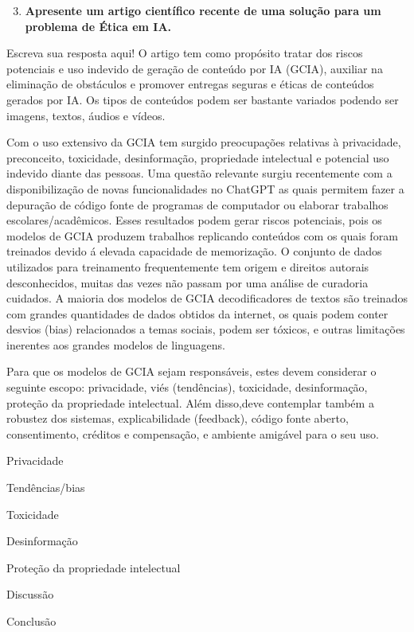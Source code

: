 \begin{enumerate}\setcounter{enumi}{2}\bfseries
    \item  \textbf{Apresente um artigo científico recente de uma solução para um problema de Ética em IA.}
\end{enumerate}

Escreva sua resposta aqui!
O artigo \cite{chen_fu_lyu} tem como propósito tratar dos riscos potenciais e uso indevido de geração de conteúdo 
por IA (GCIA), 
auxiliar na eliminação de obstáculos e promover entregas seguras e éticas de conteúdos gerados por IA. 
Os tipos de conteúdos podem ser bastante variados podendo ser imagens, textos, áudios e vídeos. 


Com o uso extensivo da GCIA tem surgido preocupações relativas à privacidade, preconceito, toxicidade, desinformação, 
propriedade intelectual e potencial uso indevido diante das pessoas. Uma questão relevante surgiu recentemente com a 
disponibilização de novas funcionalidades no ChatGPT as quais permitem fazer a depuração de código fonte de programas de 
computador ou elaborar trabalhos escolares/acadêmicos. Esses resultados podem gerar riscos potenciais, pois os modelos 
de GCIA produzem trabalhos replicando conteúdos com os quais foram treinados devido á elevada capacidade de memorização.
O conjunto de dados utilizados para 
treinamento frequentemente tem origem e direitos autorais desconhecidos, muitas das vezes não passam por uma análise 
de curadoria cuidados. A maioria dos modelos de GCIA decodificadores de textos são treinados com grandes quantidades 
de dados obtidos da internet, os quais podem conter desvios (bias) relacionados a temas sociais, podem ser tóxicos, 
e outras limitações inerentes aos grandes modelos de linguagens.

Para que os modelos de GCIA sejam responsáveis, estes devem considerar o seguinte escopo: 
privacidade, viés (tendências), toxicidade, desinformação, proteção da propriedade intelectual. 
Além disso,deve contemplar também a robustez dos sistemas, explicabilidade (feedback),
código fonte aberto, consentimento, créditos e compensação, e ambiente amigável para o seu uso.


Privacidade

Tendências/bias

Toxicidade

Desinformação

Proteção da propriedade intelectual

Discussão 

Conclusão 

